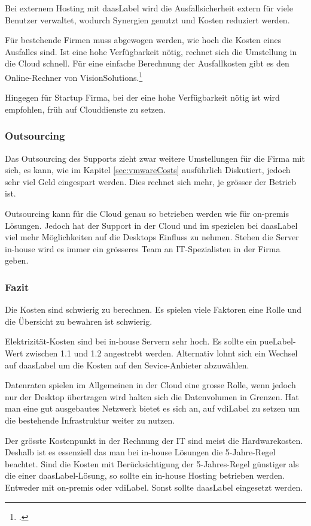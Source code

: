 Bei externem Hosting mit \Gls{daasLabel} wird die Ausfallsicherheit extern für viele Benutzer verwaltet, wodurch Synergien genutzt und Kosten reduziert werden.

Für bestehende Firmen muss abgewogen werden, wie hoch die Kosten eines Ausfalles sind. Ist eine hohe Verfügbarkeit nötig, rechnet sich die Umstellung in die Cloud schnell. Für eine einfache Berechnung der Ausfallkosten gibt es den Online-Rechner von VisionSolutions.\footcite{Disaster_Recovery_Resouce_Center_-_Vision_Solutions_2014-12-22}

Hingegen für Startup Firma, bei der eine hohe Verfügbarkeit nötig ist wird empfohlen, früh auf Clouddienste zu setzen.

\subsubsection{Outsourcing}
Das Outsourcing des Supports zieht zwar weitere Umstellungen für die Firma mit sich, es kann, wie im Kapitel \cref{sec:vmwareCosts} ausführlich Diskutiert, jedoch sehr viel Geld eingespart werden. Dies rechnet sich mehr, je grösser der Betrieb ist.

Outsourcing kann für die Cloud genau so betrieben werden wie für on-premis Lösungen. Jedoch hat der Support in der Cloud und im spezielen bei \Gls{daasLabel} viel mehr Möglichkeiten auf die Desktops Einfluss zu nehmen. Stehen die Server in-house wird es immer ein grösseres Team an IT-Spezialisten in der Firma geben.

\subsubsection{Fazit}
Die Kosten sind schwierig zu berechnen. Es spielen viele Faktoren eine Rolle und die Übersicht zu bewahren ist schwierig.

Elektrizität-Kosten sind bei in-house Servern sehr hoch. Es sollte ein \Gls{pueLabel}-Wert zwischen 1.1 und 1.2 angestrebt werden. Alternativ lohnt sich ein Wechsel auf \Gls{daasLabel} um die Kosten auf den Sevice-Anbieter abzuwählen.

Datenraten spielen im Allgemeinen in der Cloud eine grosse Rolle, wenn jedoch nur der Desktop übertragen wird halten sich die Datenvolumen in Grenzen. Hat man eine gut ausgebautes Netzwerk bietet es sich an, auf \Gls{vdiLabel} zu setzen um die bestehende Infrastruktur weiter zu nutzen.

Der grösste Kostenpunkt in der Rechnung der IT sind meist die Hardwarekosten. Deshalb ist es essenziell das man bei in-house Lösungen die 5-Jahre-Regel beachtet. Sind die Kosten mit Berücksichtigung der 5-Jahres-Regel günstiger als die einer \Gls{daasLabel}-Lösung, so sollte ein in-house Hosting betrieben werden. Entweder mit on-premis oder \Gls{vdiLabel}. Sonst sollte \Gls{daasLabel} eingesetzt werden.

